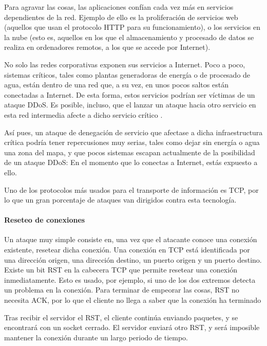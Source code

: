 Para agravar las cosas, las aplicaciones confían cada vez más en servicios dependientes de la red. Ejemplo de ello es 
la proliferación de servicios web (aquellos que usan el protocolo \acrshort{HTTP} para su 
funcionamiento), o los servicios en la nube (esto es, aquellos en los que el almacenamiento 
y procesado de datos se realiza en ordenadores remotos, a los que se accede por Internet). 

No solo las redes corporativas exponen sus servicios a Internet. Poco a poco, sistemas críticos, tales como plantas 
generadoras de energía o de procesado de agua, están dentro de una red que, a su vez, en unos pocos saltos están 
conectadas a Internet. De esta forma, estos servicios podrían ser víctimas de un ataque DDoS. Es posible, incluso, que 
el lanzar un ataque hacia otro servicio en esta red intermedia afecte a dicho servicio crítico \cite{Raghavan}.

Así pues, un ataque de denegación de servicio que afectase a dicha infraestructura crítica podría tener repercusiones 
muy serias, tales como dejar sin energía o agua una zona del mapa, y que pocos sistemas escapan actualmente de la 
posibilidad de un ataque DDoS: En el momento que lo conectas a Internet, estás expuesto a ello.

Uno de los protocolos más usados para el transporte de información es \gls{TCP}, por lo que un gran porcentaje de 
ataques van dirigidos contra esta tecnología.

\paragraph{Reseteo de conexiones}\mbox{\newline}

Un ataque muy simple consiste en, una vez que el atacante conoce una conexión existente, resetear dicha conexión. Una 
conexión en \gls{TCP} está identificada por una dirección origen, una dirección destino, un puerto origen y un puerto 
destino. Existe un bit RST en la cabecera \gls{TCP} que permite resetear una conexión inmediatamente. 
Esto es usado, por ejemplo, si uno de los dos extremos detecta un problema en la conexión. Para terminar de empeorar 
las cosas, RST no necesita \gls{ACK}, por lo que el cliente no llega a saber que la conexión ha terminado

Tras recibir el servidor el RST, el cliente continúa enviando paquetes, y se encontrará con un socket cerrado. El 
servidor enviará otro RST, y será imposible mantener la conexión durante un largo periodo de tiempo. 

